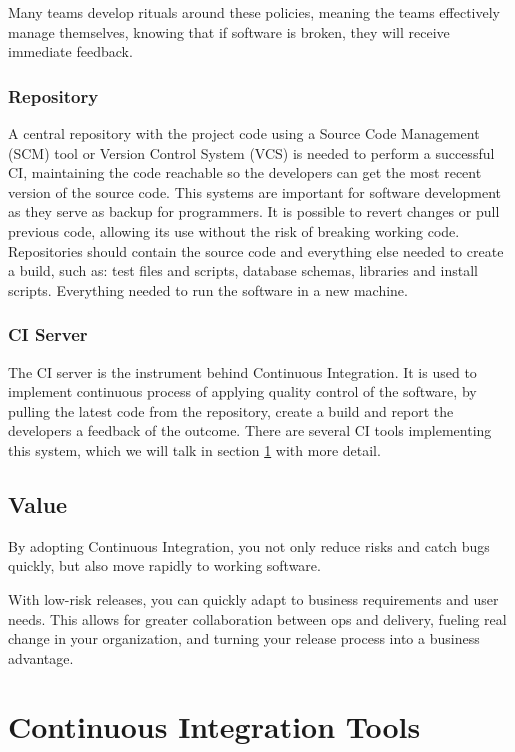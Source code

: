 Many teams develop rituals around these policies, meaning the teams effectively manage themselves, knowing that if software is broken, they will receive immediate feedback.

\subsubsection{Repository}\label{repository}
A central repository with the project code using a Source Code Management (SCM) tool or Version Control System (VCS) is needed to perform a successful CI, maintaining the code reachable so the developers can get the most recent version of the source code.
This systems are important for software development as they serve as backup for programmers. It is possible to revert changes or pull previous code, allowing its use without the risk of breaking working code.
Repositories should contain the source code and everything else needed to create a build, such as: test files and scripts, database schemas, libraries and install scripts. Everything needed to run the software in a new machine.

\subsubsection{CI Server}
The CI server is the instrument behind Continuous Integration. It is used to implement continuous process of applying quality control of the software, by pulling the latest code from the repository, create a build and report the developers a feedback of the outcome.
There are several CI tools implementing this system, which we will talk in section \ref{sec:ci_tools} with more detail.

\subsection{Value}
By adopting Continuous Integration, you not only reduce risks and catch bugs quickly, but also move rapidly to working software.

With low-risk releases, you can quickly adapt to business requirements and user needs. This allows for greater collaboration between ops and delivery, fueling real change in your organization, and turning your release process into a business advantage.

\section{Continuous Integration Tools}\label{sec:ci_tools}

